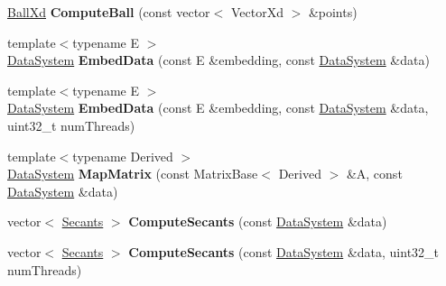 \begin{DoxyCompactItemize}
\item 
\hypertarget{namespace_d_r_d_s_p_a43b75234569c1d89280be5e50df064f3}{\hyperlink{struct_d_r_d_s_p_1_1_ball}{Ball\-Xd} {\bfseries Compute\-Ball} (const vector$<$ Vector\-Xd $>$ \&points)}\label{namespace_d_r_d_s_p_a43b75234569c1d89280be5e50df064f3}

\item 
\hypertarget{namespace_d_r_d_s_p_ad378ab249fa9abf1d726e1b12bc9d7d5}{{\footnotesize template$<$typename E $>$ }\\\hyperlink{struct_d_r_d_s_p_1_1_data_system}{Data\-System} {\bfseries Embed\-Data} (const E \&embedding, const \hyperlink{struct_d_r_d_s_p_1_1_data_system}{Data\-System} \&data)}\label{namespace_d_r_d_s_p_ad378ab249fa9abf1d726e1b12bc9d7d5}

\item 
\hypertarget{namespace_d_r_d_s_p_a0cdc1c82147be28daee0ad7682c73366}{{\footnotesize template$<$typename E $>$ }\\\hyperlink{struct_d_r_d_s_p_1_1_data_system}{Data\-System} {\bfseries Embed\-Data} (const E \&embedding, const \hyperlink{struct_d_r_d_s_p_1_1_data_system}{Data\-System} \&data, uint32\-\_\-t num\-Threads)}\label{namespace_d_r_d_s_p_a0cdc1c82147be28daee0ad7682c73366}

\item 
\hypertarget{namespace_d_r_d_s_p_a8be4fb8808ef04a4c5b29eb7f6afd0e9}{{\footnotesize template$<$typename Derived $>$ }\\\hyperlink{struct_d_r_d_s_p_1_1_data_system}{Data\-System} {\bfseries Map\-Matrix} (const Matrix\-Base$<$ Derived $>$ \&A, const \hyperlink{struct_d_r_d_s_p_1_1_data_system}{Data\-System} \&data)}\label{namespace_d_r_d_s_p_a8be4fb8808ef04a4c5b29eb7f6afd0e9}

\item 
\hypertarget{namespace_d_r_d_s_p_a2fad6e7371d3c4d68e9cebe2effa11b6}{vector$<$ \hyperlink{struct_d_r_d_s_p_1_1_secants}{Secants} $>$ {\bfseries Compute\-Secants} (const \hyperlink{struct_d_r_d_s_p_1_1_data_system}{Data\-System} \&data)}\label{namespace_d_r_d_s_p_a2fad6e7371d3c4d68e9cebe2effa11b6}

\item 
\hypertarget{namespace_d_r_d_s_p_a0e6e28872434157a54a98036959a8ca3}{vector$<$ \hyperlink{struct_d_r_d_s_p_1_1_secants}{Secants} $>$ {\bfseries Compute\-Secants} (const \hyperlink{struct_d_r_d_s_p_1_1_data_system}{Data\-System} \&data, uint32\-\_\-t num\-Threads)}\label{namespace_d_r_d_s_p_a0e6e28872434157a54a98036959a8ca3}


\end{DoxyCompactItemize}
